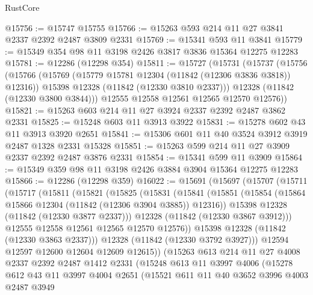 \begin{lexlean}{RustCore}
\begin{coremodule}
@15756 := @15747 @15755
@15766 := @15263 @593 @214 @11 @27 @3841 @2337 @2392 @2487 @3809 @2331
@15769 := @15341 @593 @11 @3841
@15779 := @15349 @354 @98 @11 @3198 @2426 @3817 @3836 @15364 @12275 @12283
@15781 := @12286 (@12298 @354)
@15811 := @15727
    (@15731
      (@15737
        (@15756
          (@15766
            (@15769 (@15779 @15781 @12304 (@11842 (@12306 @3836 @3818)) @12316))
            @15398
            @12328
            (@11842 (@12330 @3810 @2337)))
          @12328
          (@11842 (@12330 @3800 @3844)))
        @12555
        @12558
        @12561
        @12565
        @12570
        @12576))
@15821 := @15263 @603 @214 @11 @27 @3924 @2337 @2392 @2487 @3862 @2331
@15825 := @15248 @603 @11 @3913 @3922
@15831 := @15278 @602 @43 @11 @3913 @3920 @2651
@15841 := @15306 @601 @11 @40 @3524 @3912 @3919 @2487 @1328 @2331 @15328
@15851 := @15263 @599 @214 @11 @27 @3909 @2337 @2392 @2487 @3876 @2331
@15854 := @15341 @599 @11 @3909
@15864 := @15349 @359 @98 @11 @3198 @2426 @3884 @3904 @15364 @12275 @12283
@15866 := @12286 (@12298 @359)
@16022 := @15691
    (@15697
      (@15707
        (@15711
          (@15717
            (@15811
              (@15821
                (@15825
                  (@15831
                    (@15841
                      (@15851
                        (@15854 (@15864 @15866 @12304 (@11842 (@12306 @3904 @3885)) @12316))
                        @15398
                        @12328
                        (@11842 (@12330 @3877 @2337)))
                      @12328
                      (@11842 (@12330 @3867 @3912)))
                    @12555
                    @12558
                    @12561
                    @12565
                    @12570
                    @12576))
                @15398
                @12328
                (@11842 (@12330 @3863 @2337)))
              @12328
              (@11842 (@12330 @3792 @3927)))
            @12594
            @12597
            @12600
            @12604
            @12609
            @12615))
        (@15263
          @613
          @214
          @11
          @27
          @4008
          @2337
          @2392
          @2487
          @1412
          @2331
          (@15248
            @613
            @11
            @3997
            @4006
            (@15278
              @612
              @43
              @11
              @3997
              @4004
              @2651
              (@15521
                @611
                @11
                @40
                @3652
                @3996
                @4003
                @2487
                @3949

\end{coremodule}
\end{lexlean}
